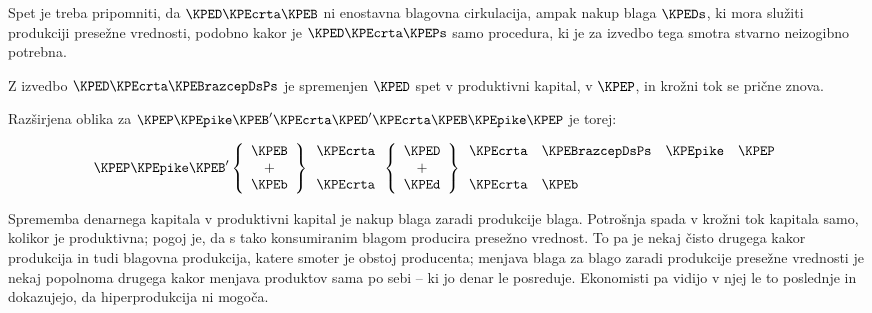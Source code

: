 \documentclass[kapital_02.tex]{subfiles}
\begin{document}
Spet je treba pripomniti, da \( \KPED \KPEcrta \KPEB \) ni enostavna blagovna cirkulacija, ampak nakup blaga \( \KPEDs \), ki mora služiti produkciji presežne vrednosti, podobno kakor je \( \KPED \KPEcrta \KPEPs \) samo procedura, ki je za izvedbo tega smotra stvarno neizogibno potrebna.

Z izvedbo \( \KPED \KPEcrta \KPEBrazcepDsPs \) je spremenjen \( \KPED \) spet v produktivni kapital, v \( \KPEP \), in krožni tok se prične znova.

Razširjena oblika za \( \KPEP \KPEpike \KPEB' \KPEcrta \KPED' \KPEcrta \KPEB \KPEpike \KPEP \) je torej:

\[
    \KPEP
    \KPEpike
    \KPEB'
    \left\lbrace
    \begin{array}{c}
        \KPEB \\
        \textrm{+} \\
        \KPEb \\
    \end{array}
    \right\rbrace
    \begin{array}{c}
        \KPEcrta \\
         \\
        \KPEcrta \\
    \end{array}
    \left\lbrace
    \begin{array}{c}
        \KPED \\
        \textrm{+} \\
        \KPEd \\
    \end{array}
    \right\rbrace
    \begin{array}{c l c c}
        \KPEcrta & \KPEBrazcepDsPs & \KPEpike & \KPEP \\
         & & & \\
        \KPEcrta & \KPEb & & \\
    \end{array}
\]

Sprememba denarnega kapitala v produktivni kapital je nakup blaga zaradi produkcije blaga. Potrošnja spada v krožni tok kapitala samo, kolikor je produktivna; pogoj je, da s tako konsumiranim blagom producira presežno vrednost. To pa je nekaj čisto drugega kakor produkcija in tudi blagovna produkcija, katere smoter je obstoj producenta; menjava blaga za blago zaradi produkcije presežne vrednosti je nekaj popolnoma drugega kakor menjava produktov sama po sebi -- ki jo denar le posreduje. Ekonomisti pa vidijo v njej le to poslednje in dokazujejo, da hiperprodukcija ni mogoča.
\end{document}
